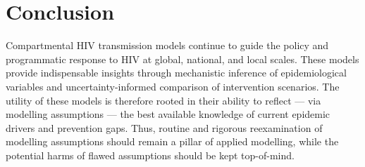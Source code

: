 \section{Conclusion}\label{conc.conc}
Compartmental HIV transmission models continue to guide
the policy and programmatic response to HIV at global, national, and local scales.
These models provide indispensable insights through
mechanistic inference of epidemiological variables and
uncertainty-informed comparison of intervention scenarios.
The utility of these models is therefore rooted in their ability to reflect
--- via modelling assumptions ---
the best available knowledge of current epidemic drivers and prevention gaps.
Thus, routine and rigorous reexamination of modelling assumptions
should remain a pillar of applied modelling,
while the potential harms of flawed assumptions should be kept top-of-mind.
